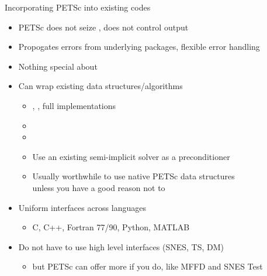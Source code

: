\begin{frame}{Incorporating PETSc into existing codes}
  \begin{itemize}
  \item PETSc does not seize , does not control output
  \item Propogates errors from underlying packages, flexible error handling
  \item Nothing special about 
  \item Can wrap existing data structures/algorithms
    \begin{itemize}
    \item {}, , full implementations
    \item {}
    \item {}
    \item Use an existing semi-implicit solver as a preconditioner
    \item Usually worthwhile to use native PETSc data structures \\
      unless you have a good reason not to
    \end{itemize}
  \item Uniform interfaces across languages
    \begin{itemize}
    \item C, C++, Fortran 77/90, Python, MATLAB
    \end{itemize}
  \item Do not have to use high level interfaces (\eg SNES, TS, DM)
    \begin{itemize}
    \item but PETSc can offer more if you do, like MFFD and SNES Test
    \end{itemize}
  \end{itemize}
\end{frame}
